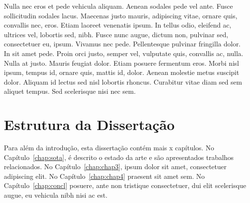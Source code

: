 Nulla nec eros et pede vehicula aliquam. Aenean sodales pede vel
ante. Fusce sollicitudin sodales lacus. Maecenas justo mauris,
adipiscing vitae, ornare quis, convallis nec, eros. Etiam laoreet
venenatis ipsum. In tellus odio, eleifend ac, ultrices vel, lobortis
sed, nibh. Fusce nunc augue, dictum non, pulvinar sed, consectetuer
eu, ipsum. Vivamus nec pede. Pellentesque pulvinar fringilla dolor. In
sit amet pede. Proin orci justo, semper vel, vulputate quis, convallis
ac, nulla. Nulla at justo. Mauris feugiat dolor. Etiam posuere
fermentum eros. Morbi nisl ipsum, tempus id, ornare quis, mattis id,
dolor. Aenean molestie metus suscipit dolor. Aliquam id lectus sed
nisl lobortis rhoncus. Curabitur vitae diam sed sem aliquet
tempus. Sed scelerisque nisi nec sem. 


\section{Estrutura da Dissertação} \label{sec:struct}

Para além da introdução, esta dissertação contém mais x capítulos.
No Capítulo~\ref{chap:sota}, é descrito o estado da arte e são
apresentados trabalhos relacionados. 
No Capítulo~\ref{chap:chap3}, ipsum dolor sit amet, consectetuer
adipiscing elit.
No Capítulo~\ref{chap:chap4} praesent sit amet sem. 
No Capítulo~\ref{chap:concl} posuere, ante non tristique
consectetuer, dui elit scelerisque augue, eu vehicula nibh nisi ac
est. 
